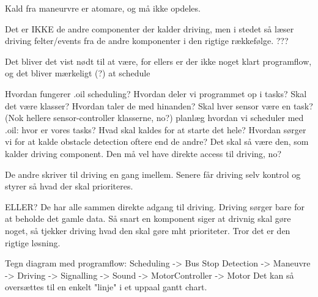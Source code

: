 Kald fra maneurvre er atomare, og må ikke opdeles. 

Det er IKKE de andre componenter der kalder driving, men i stedet så læser driving felter/events fra de andre komponenter i den rigtige rækkefølge. ???

Det bliver det vist nødt til at være, for ellers er der ikke noget klart programflow, og det bliver mærkeligt (?) at schedule



Hvordan fungerer .oil scheduling? Hvordan deler vi programmet op i tasks? Skal det være klasser? Hvordan taler de med hinanden? Skal hver sensor være en task? (Nok hellere sensor-controller klasserne, no?)
planlæg hvordan vi scheduler med .oil: hvor er vores tasks? Hvad skal kaldes for at starte det hele?
Hvordan sørger vi for at kalde obstacle detection oftere end de andre? Det skal så være den, som kalder driving component. Den må vel have direkte access til driving, no?

De andre skriver til driving en gang imellem.
Senere får driving selv kontrol og styrer så hvad der skal prioriteres. 

ELLER?
De har alle sammen direkte adgang til driving. Driving sørger bare for at beholde det gamle data. Så snart en komponent siger at drivnig skal gøre noget, så tjekker driving hvad den skal gøre mht prioriteter. 
Tror det er den rigtige løsning. 

Tegn diagram med programflow: Scheduling -> Bus Stop Detection -> Maneuvre -> Driving -> Signalling -> Sound -> MotorController -> Motor
Det kan så oversættes til en enkelt "linje" i et uppaal gantt chart. 